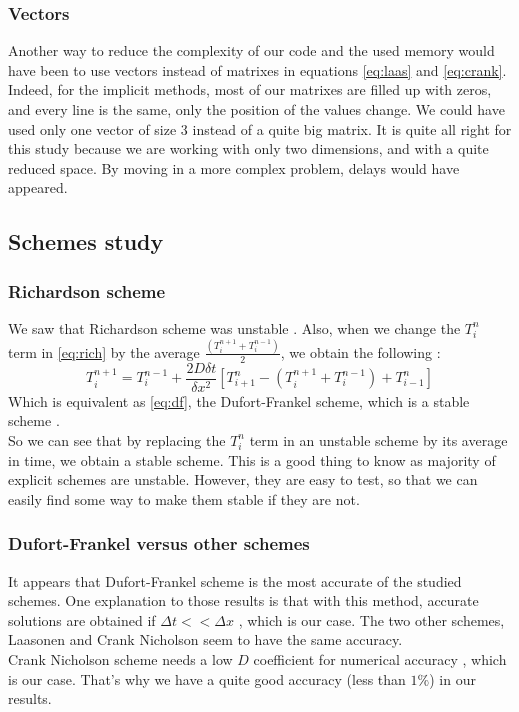\documentclass{article}
\begin{document}
                \subsubsection{Vectors}
                    Another way to reduce the complexity of our code and the used memory would have been to use vectors instead
                    of matrixes in equations \eqref{eq:laas} and \eqref{eq:crank}. Indeed, for the implicit methods, most of our matrixes are filled up with zeros, and every line is
                    the same, only the position of the values change. We could have used only one vector of size 3 instead of a quite big matrix.
                    It is quite all right for this study because we are working with only two dimensions, and with a quite reduced space.
                    By moving in a more complex problem, delays would have appeared.
            \subsection{Schemes study}
                \subsubsection{Richardson scheme}
                    We saw that Richardson scheme was unstable \cite{rich}. Also, when we change the $T_{i}^n$ term
                    in \eqref{eq:rich} by the average $\frac{(T_i^{n+1}+T_i^{n-1})}{2}$, we obtain the following :
                    \begin{equation}
                        T_i^{n+1} = T_i^{n-1} + \frac{2D\delta t}{\delta x^2}[T_{i+1}^n - (T_i^{n+1}+T_i^{n-1}) + T_{i-1}^n]
                    \end{equation}
                    Which is equivalent as \eqref{eq:df}, the Dufort-Frankel scheme, which is a stable scheme \cite{df}.
                    \\
                    So we can see that by replacing the $T_{i}^n$ term in an unstable scheme by its average in time, we obtain 
                    a stable scheme. This is a good thing to know as majority of explicit schemes are unstable. However, they are
                    easy to test, so that we can easily find some way to make them stable if they are not.
                \subsubsection{Dufort-Frankel versus other schemes}
                    It appears that Dufort-Frankel scheme is the most accurate of the studied schemes. One explanation to those
                    results is that with this method, accurate solutions are obtained if $\Delta t << \Delta x$ \cite{df}, which
                    is our case.
                    The two other schemes, Laasonen and Crank Nicholson seem to have the same accuracy.
                    \\
                    Crank Nicholson scheme needs a low $D$ coefficient for numerical accuracy \cite{crank}, which is our case. That's why 
                    we have a quite good accuracy (less than $1\%$) in our results.
                
\end{document}
